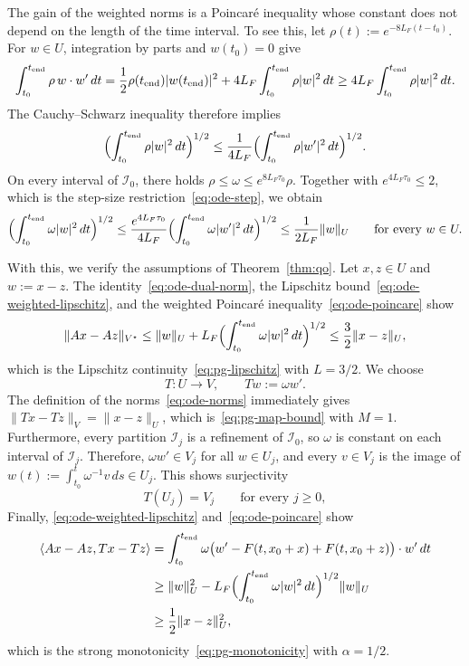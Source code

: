 \documentclass[10pt,reqno]{amsart}
\theoremstyle{definition}
\theoremstyle{remark}
\newcommand{\norm}[1]{\lVert #1\rVert}
\newcommand{\dual}[2]{\langle #1,#2\rangle}
\begin{document}
\noindent
The gain of the weighted norms is a Poincar\'e inequality whose constant does not depend on the length of the time interval. To see this, let $\rho(t):=e^{-8L_F(t-t_0)}$. For $w\in U$, integration by parts and $w(t_0)=0$ give
\[
  \int_{t_0}^{t_{\rm end}}\rho\,w\cdot w'\,dt
  =\frac12\rho(t_{\rm end})|w(t_{\rm end})|^2
     +4L_F\int_{t_0}^{t_{\rm end}}\rho|w|^2\,dt
  \ge4L_F\int_{t_0}^{t_{\rm end}}\rho|w|^2\,dt.
\]
The Cauchy--Schwarz inequality therefore implies
\[
  \Bigl(\int_{t_0}^{t_{\rm end}}\rho|w|^2\,dt\Bigr)^{1/2}
  \le\frac{1}{4L_F}\Bigl(\int_{t_0}^{t_{\rm end}}\rho|w'|^2\,dt\Bigr)^{1/2}.
\]
On every interval of $\mathcal I_0$, there holds $\rho\le\omega\le e^{8L_F\tau_0}\rho$. Together with $e^{4L_F\tau_0}\le2$, which is the step-size restriction~\eqref{eq:ode-step}, we obtain
\begin{equation}\label{eq:ode-poincare}
  \Bigl(\int_{t_0}^{t_{\rm end}}\omega|w|^2\,dt\Bigr)^{1/2}
  \le\frac{e^{4L_F\tau_0}}{4L_F}
          \Bigl(\int_{t_0}^{t_{\rm end}}\omega|w'|^2\,dt\Bigr)^{1/2}
  \le\frac{1}{2L_F}\norm{w}_U
  \qquad\text{for every }w\in U.
\end{equation}

\noindent
With this, we verify the assumptions of Theorem~\ref{thm:qo}. Let $x,z\in U$ and $w:=x-z$. The identity~\eqref{eq:ode-dual-norm}, the Lipschitz bound~\eqref{eq:ode-weighted-lipschitz}, and the weighted Poincar\'e inequality~\eqref{eq:ode-poincare} show
\[
  \norm{Ax-Az}_{V^\star}
  \le\norm{w}_U+L_F\Bigl(\int_{t_0}^{t_{\rm end}}\omega|w|^2\,dt\Bigr)^{1/2}
  \le\frac32\norm{x-z}_U,
\]
which is the Lipschitz continuity~\eqref{eq:pg-lipschitz} with $L=3/2$. We choose
\[
  T:U\to V,\qquad Tw:=\omega w'.
\]
The definition of the norms~\eqref{eq:ode-norms} immediately gives $\norm{Tx-Tz}_V=\norm{x-z}_U$, which is~\eqref{eq:pg-map-bound} with $M=1$. Furthermore, every partition $\mathcal I_j$ is a refinement of $\mathcal I_0$, so $\omega$ is constant on each interval of $\mathcal I_j$. Therefore, $\omega w'\in V_j$ for all $w\in U_j$, and every $v\in V_j$ is the image of $w(t):=\int_{t_0}^t\omega^{-1}v\,ds\in U_j$. This shows surjectivity
\[
  T(U_j)=V_j\qquad\text{for every }j\ge0,
\]
 Finally, \eqref{eq:ode-weighted-lipschitz} and~\eqref{eq:ode-poincare} show
\begin{align*}
  \dual{Ax-Az}{Tx-Tz}
  &=\int_{t_0}^{t_{\rm end}}\omega\bigl(w'-F(t,x_0+x)+F(t,x_0+z)\bigr)\cdot w'\,dt\\
  &\ge\norm{w}_U^2
       -L_F\Bigl(\int_{t_0}^{t_{\rm end}}\omega|w|^2\,dt\Bigr)^{1/2}\norm{w}_U\\
  &\ge\frac12\norm{x-z}_U^2,
\end{align*}
which is the strong monotonicity~\eqref{eq:pg-monotonicity} with $\alpha=1/2$.
\end{document}
